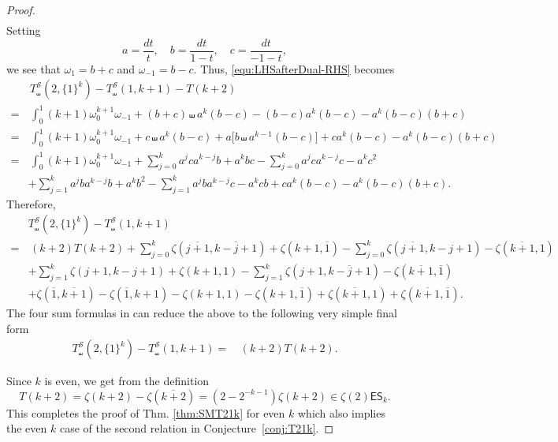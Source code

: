\documentclass{article}
\newcommand{\ES}{\mathsf {ES}}
\newcommand{\sha}{\shuffle}
\newcommand{\Sy}{{\mathcal S}}
\newcommand\om{{\omega}}
\newcommand{\ol}{\overline}
\theoremstyle{plain}
\theoremstyle{definition}
\begin{document}
\begin{proof}
\begin{align}
\end{align}
Setting
\begin{equation*}
  a=\frac{dt}{t},\quad b=\frac{dt}{1-t},\quad c=\frac{dt}{-1-t},
\end{equation*}
we see that $\om_1=b+c$ and $\om_{-1}=b-c$. Thus, \eqref{equ:LHSafterDual-RHS} becomes
\begin{align*}
&\,T_\sha^\Sy (2,\{1\}^k)- T_\sha^\Sy(1,k+1)-T(k+2) \\
=&\,\int_0^1  (k+1) \om_0^{k+1}\om_{-1}+(b+c) \sha a^k(b-c)-(b-c)a^k(b-c) - a^k(b-c) (b+c) \\
=&\,\int_0^1 (k+1) \om_0^{k+1}\om_{-1}+c \sha a^k(b-c)+a\big[b \sha a^{k-1} (b-c)\big] +c a^k(b-c) - a^k(b-c) (b+c) \\
=&\,\int_0^1 (k+1) \om_0^{k+1}\om_{-1}+\sum_{j=0}^k a^j ca^{k-j}b+a^kbc -\sum_{j=0}^k a^j ca^{k-j}c-a^kc^2\\
&+\sum_{j=1}^k a^j b a^{k-j} b+a^kb^2-\sum_{j=1}^k a^j b a^{k-j} c-a^kcb  + c a^k(b-c) - a^k(b-c) (b+c).
\end{align*}
Therefore,
\begin{align*}
& T_\sha^\Sy(2,\{1\}^k)- T_\sha^\Sy(1,k+1) \\
=&\, (k+2) T(k+2)+\sum_{j=0}^k \zeta(\ol{j+1},\ol{k-j+1}) + \zeta(k+1,\ol{1})
-\sum_{j=0}^k \zeta(\ol{j+1},k-j+1) - \zeta(\ol{k+1},1) \\
& +\sum_{j=1}^k \zeta(j+1,k-j+1) + \zeta(k+1,1)
-\sum_{j=1}^k \zeta(j+1,\ol{k-j+1}) - \zeta(\ol{k+1},\ol{1}) \\
&+\zeta( \ol{1},\ol{k+1})-\zeta(\ol{1},k+1) -\zeta(k+1,1)-\zeta(k+1,\ol{1})+\zeta(\ol{k+1},1)+\zeta(\ol{k+1},\ol{1}).
\end{align*}
The four sum formulas in \cite[Thm. 4.2]{BCJXXZhao2020c} can reduce the above to the following very simple final form
\begin{align*}
T_\sha^\Sy(2,\{1\}^k)- T_\sha^\Sy(1,k+1) =&\, (k+2) T(k+2).
\end{align*}

Since $k$ is even, we get from the definition
\begin{equation*}
T(k+2)=\zeta(k+2)-\zeta(\ol{k+2})=(2-2^{-k-1})\zeta(k+2)\in \zeta(2) \ES_{k}.
\end{equation*}
This completes the proof of Thm. \ref{thm:SMT21k} for even $k$ which also implies the even $k$ case of the second relation in Conjecture~\ref{conj:T21k}.


\end{proof}
\end{document}
